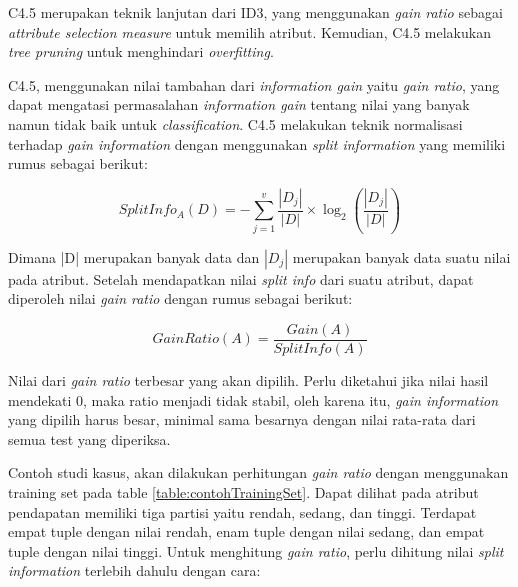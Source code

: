 C4.5 merupakan teknik lanjutan dari ID3, yang menggunakan \textsl{gain ratio} sebagai \textsl{attribute selection measure} untuk memilih atribut. Kemudian, C4.5 melakukan \textsl{tree pruning} untuk menghindari \textsl{overfitting}.


C4.5, menggunakan nilai tambahan dari \textsl{information gain} yaitu \textsl{gain ratio}, yang dapat mengatasi permasalahan \textsl{information gain} tentang nilai yang banyak namun tidak baik untuk \textsl{classification}. C4.5 melakukan teknik normalisasi terhadap \textsl{gain information} dengan menggunakan \textsl{split information} yang memiliki rumus sebagai berikut:

\begin{displaymath}
	SplitInfo_A(D) = - \sum_{j=1}^v \frac{|D_j|}{|D|} \times \log_2 (\frac{|D_j|}{|D|})
\end{displaymath}

Dimana |D| merupakan banyak data dan $|D_{j}|$ merupakan banyak data suatu nilai pada atribut.
Setelah mendapatkan nilai \textsl{split info} dari suatu atribut, dapat diperoleh nilai \textsl{gain ratio} dengan rumus sebagai berikut:

\begin{displaymath}
	GainRatio(A) = \frac{Gain(A)}{SplitInfo(A)}
\end{displaymath}

Nilai dari \textsl{gain ratio} terbesar yang akan dipilih. Perlu diketahui \cite{DM} jika nilai hasil mendekati 0, maka ratio menjadi tidak stabil, oleh karena itu, \textsl{gain information} yang dipilih harus besar, minimal sama besarnya dengan nilai rata-rata dari semua test yang diperiksa.

Contoh studi kasus, akan dilakukan perhitungan \textsl{gain ratio} dengan menggunakan training set pada table \ref{table:contohTrainingSet}. Dapat dilihat pada atribut pendapatan memiliki tiga partisi yaitu rendah, sedang, dan tinggi. Terdapat empat tuple dengan nilai rendah, enam tuple dengan nilai sedang, dan empat tuple dengan nilai tinggi. Untuk menghitung \textsl{gain ratio}, perlu dihitung nilai \textsl{split information} terlebih dahulu dengan cara:

